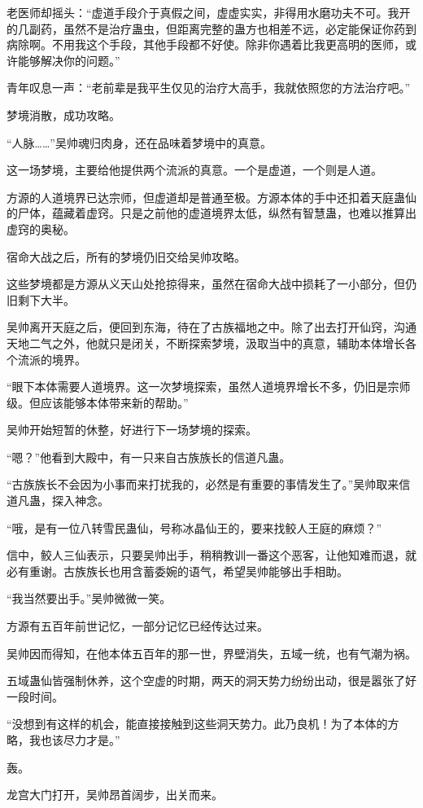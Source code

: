 \begin{this_body}
老医师却摇头：“虚道手段介于真假之间，虚虚实实，非得用水磨功夫不可。我开的几副药，虽然不是治疗蛊虫，但距离完整的蛊方也相差不远，必定能保证你药到病除啊。不用我这个手段，其他手段都不好使。除非你遇着比我更高明的医师，或许能够解决你的问题。”

青年叹息一声：“老前辈是我平生仅见的治疗大高手，我就依照您的方法治疗吧。”

梦境消散，成功攻略。

“人脉……”吴帅魂归肉身，还在品味着梦境中的真意。

这一场梦境，主要给他提供两个流派的真意。一个是虚道，一个则是人道。

方源的人道境界已达宗师，但虚道却是普通至极。方源本体的手中还扣着天庭蛊仙的尸体，蕴藏着虚窍。只是之前他的虚道境界太低，纵然有智慧蛊，也难以推算出虚窍的奥秘。

宿命大战之后，所有的梦境仍旧交给吴帅攻略。

这些梦境都是方源从义天山处抢掠得来，虽然在宿命大战中损耗了一小部分，但仍旧剩下大半。

吴帅离开天庭之后，便回到东海，待在了古族福地之中。除了出去打开仙窍，沟通天地二气之外，他就只是闭关，不断探索梦境，汲取当中的真意，辅助本体增长各个流派的境界。

“眼下本体需要人道境界。这一次梦境探索，虽然人道境界增长不多，仍旧是宗师级。但应该能够本体带来新的帮助。”

吴帅开始短暂的休整，好进行下一场梦境的探索。

“嗯？”他看到大殿中，有一只来自古族族长的信道凡蛊。

“古族族长不会因为小事而来打扰我的，必然是有重要的事情发生了。”吴帅取来信道凡蛊，探入神念。

“哦，是有一位八转雪民蛊仙，号称冰晶仙王的，要来找鲛人王庭的麻烦？”

信中，鲛人三仙表示，只要吴帅出手，稍稍教训一番这个恶客，让他知难而退，就必有重谢。古族族长也用含蓄委婉的语气，希望吴帅能够出手相助。

“我当然要出手。”吴帅微微一笑。

方源有五百年前世记忆，一部分记忆已经传达过来。

吴帅因而得知，在他本体五百年的那一世，界壁消失，五域一统，也有气潮为祸。

五域蛊仙皆强制休养，这个空虚的时期，两天的洞天势力纷纷出动，很是嚣张了好一段时间。

“没想到有这样的机会，能直接接触到这些洞天势力。此乃良机！为了本体的方略，我也该尽力才是。”

轰。

龙宫大门打开，吴帅昂首阔步，出关而来。


\end{this_body}
